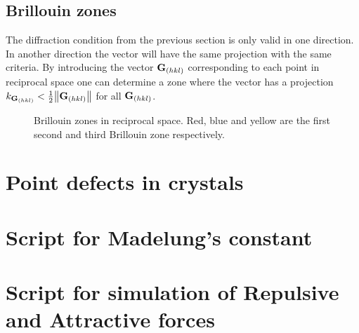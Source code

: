 \documentclass[10pt, a4paper]{amsart}
\begin{document}
\subsection{Brillouin zones}
The diffraction condition from the previous section is only valid in one direction. In another direction the vector will have the same projection with the same criteria. By introducing the vector $\vb{G}_{(hkl)}$ corresponding to each point in reciprocal space one can determine a zone where the vector has a projection $k_{\vb{G}_{(hkl)}} < \frac{1}{2}\norm{\vb{G}_{(hkl)}}$ for all $\vb{G}_{(hkl)}$.

\begin{figure}[ht]
	\centering
	\caption{Brillouin zones in reciprocal space. Red, blue and yellow are the first second and third Brillouin zone respectively.}
	\label{fig:brillouin}	
\end{figure}

\section{Point defects in crystals}

\vfill

\pagebreak

\begin{appendices}

\section{Script for Madelung's constant}
\label{app:madelung}


\section{Script for simulation of Repulsive and Attractive forces}
\label{app:forces}


\end{appendices}
\end{document}
